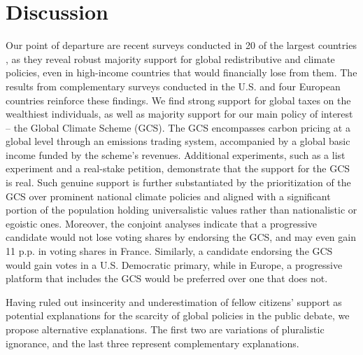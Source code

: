\section{Discussion} %
Our point of departure are recent surveys conducted %
in 20 of the largest countries%
, as they reveal robust majority support for global redistributive and climate policies, even in high-income countries that would financially lose from them. The results from complementary surveys conducted in the U.S. and four European countries %
reinforce these findings. We find strong support for global taxes on the wealthiest individuals, as well as majority support for our main policy of interest -- the Global Climate Scheme (GCS). The GCS encompasses carbon pricing at a global level through an emissions trading system, accompanied by a global basic income funded by the scheme's revenues. Additional experiments, such as a list experiment and a real-stake petition, demonstrate that the support for the GCS is real. 
Such genuine support is further substantiated by the prioritization of the GCS over prominent national climate policies and aligned with a significant portion of the population holding universalistic values rather than nationalistic or egoistic ones. Moreover, the conjoint analyses indicate that a progressive candidate would not lose voting shares by endorsing the GCS, and may even gain 11 p.p. in voting shares in France. Similarly, a candidate endorsing the GCS would gain votes in a U.S. Democratic primary, while in Europe, a progressive platform that includes the GCS would be preferred over one that does not.

Having ruled out insincerity and underestimation of fellow citizens' support as potential explanations for the scarcity of global policies in the public debate, we propose alternative explanations. %
The first two are variations of pluralistic ignorance, and the last three represent complementary explanations. 

